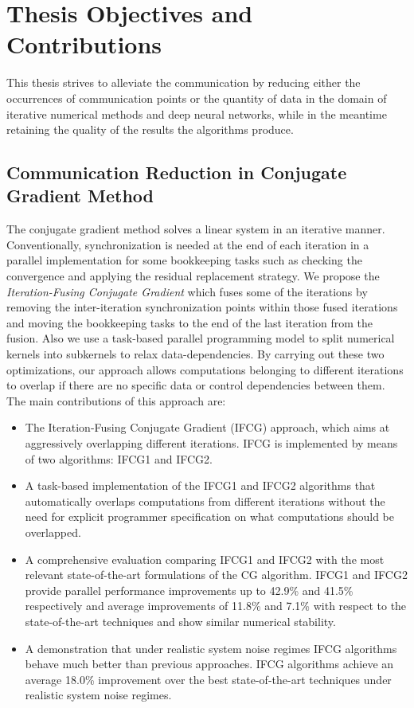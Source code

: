 \section{Thesis Objectives and Contributions}
This thesis strives to alleviate the communication by reducing either the 
occurrences of communication points or the quantity of data in the domain of 
iterative numerical methods and deep neural networks, while in the meantime 
retaining the quality of the results the algorithms produce. 

\subsection{Communication Reduction in Conjugate Gradient Method}
The conjugate gradient method solves a linear system in an iterative manner. 
Conventionally, synchronization is needed at the end of each iteration in a 
parallel implementation for some bookkeeping tasks such as checking the 
convergence and applying the residual replacement strategy. 
We propose the \emph{Iteration-Fusing Conjugate Gradient} which fuses some of the 
iterations by removing the inter-iteration synchronization points within those fused 
iterations and moving the bookkeeping tasks to the end of the last iteration from the fusion. 
Also we use a task-based parallel programming model to split numerical kernels 
into subkernels to relax data-dependencies. By carrying out these two optimizations, 
our approach allows computations belonging to different iterations to overlap if 
there are no specific data or control dependencies between them.
The main contributions of this approach are:
\begin{itemize}
       \item The Iteration-Fusing Conjugate Gradient (IFCG) approach, which aims 
           at aggressively overlapping different iterations. IFCG is implemented 
           by means of two algorithms: IFCG1 and IFCG2.
       \item A task-based implementation of the IFCG1 and IFCG2 algorithms that 
           automatically overlaps computations from different iterations without 
           the need for explicit programmer specification on what computations should be overlapped.
       \item A comprehensive evaluation comparing IFCG1 and IFCG2 with the most 
           relevant state-of-the-art formulations of the CG algorithm. 
           IFCG1 and IFCG2 provide parallel performance improvements up to 42.9\% 
           and 41.5\% respectively and average improvements of 11.8\% and 7.1\% with 
           respect to the state-of-the-art techniques and show similar numerical stability.
        \item A demonstration that under realistic system noise regimes IFCG 
            algorithms behave much better than previous approaches. IFCG algorithms 
            achieve an average 18.0\% improvement over the best state-of-the-art 
            techniques under realistic system noise regimes.
\end{itemize}

